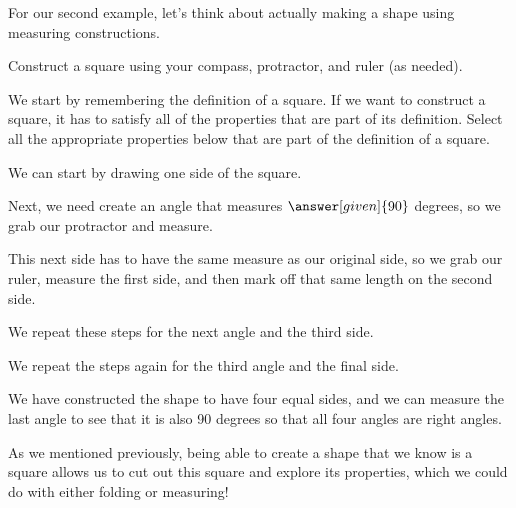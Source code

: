 \documentclass{ximera}
\begin{document}
For our second example, let's think about actually making a shape using measuring constructions.
\begin{example}
	Construct a square using your compass, protractor, and ruler (as needed). 
	
	We start by remembering the definition of a square. If we want to construct a square, it has to satisfy all of the properties that are part of its definition. Select all the appropriate properties below that are part of the definition of a square.
	\begin{selectAll}
	\end{selectAll}
We can start by drawing one side of the square.
\begin{image}
\end{image}
Next, we need create an angle that measures $\answer[given]{90}$ degrees, so we grab our protractor and measure. 
\begin{image}
\end{image}
This next side has to have the same measure as our original side, so we grab our ruler, measure the first side, and then mark off that same length on the second side.
\begin{image}
\end{image}
We repeat these steps for the next angle and the third side.
\begin{image}
\end{image}
We repeat the steps again for the third angle and the final side.
\begin{image}
\end{image}
We have constructed the shape to have four equal sides, and we can measure the last angle to see that it is also 90 degrees so that all four angles are right angles. 
\end{example}
As we mentioned previously, being able to create a shape that we know is a square allows us to cut out this square and explore its properties, which we could do with either folding or measuring!
\end{document}
